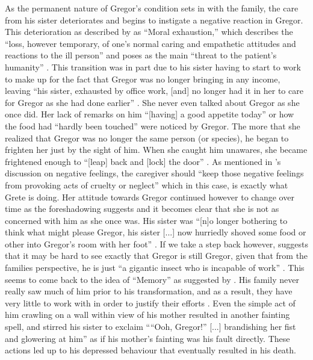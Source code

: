 \documentclass{article}
\begin{document}

As the permanent nature of Gregor's condition sets in with the family, the
care from his sister deteriorates and begins to instigate a negative
reaction in Gregor. This deterioration as described by \citeauthor{rowe2002}
as ``Moral exhaustion,'' which describes the ``loss, however temporary, of
one's normal caring and empathetic attitudes and reactions to the ill
person'' and poses as the main ``threat to the patient's humanity''
\cite[275, 275, 275]{rowe2002}. This transition was in part due to his
sister having to start to work to make up for the fact that Gregor was no
longer bringing in any income, leaving ``his sister, exhausted by office
work, [and] no longer had it in her to care for Gregor as she had done
earlier'' \cite[131]{kafka2007meta}. She never even talked about Gregor as
she once did. Her lack of remarks on him ``[having] a good appetite today''
or how the food had ``hardly been touched'' \cite[111, 111]{kafka2007meta}
were noticed by Gregor. The more that she realized that Gregor was no longer
the same person (or species), he began to frighten her just by the sight of
him. When she caught him unawares, she became frightened enough to ``[leap]
back and [lock] the door'' \cite[116]{kafka2007meta}. As mentioned in
\citeauthor{rowe2002}'s discussion on negative feelings, the caregiver
should ``keep those negative feelings from provoking acts of cruelty or
neglect'' \cite[265]{rowe2002} which in this case, is exactly what Grete is
doing. Her attitude towards Gregor continued however to change over time as
the foreshadowing suggests and it becomes clear that she is not as concerned
with him as she once was. His sister was ``[n]o longer bothering to think
what might please Gregor, his sister [...] now hurriedly shoved some food or
other into Gregor's room with her foot'' \cite[130]{kafka2007meta}. If we
take a step back however, \citeauthor{cantrellFamily} suggests that it may
be hard to see exactly that Gregor is still Gregor, given that from the
families perspective, he is just ``a gigantic insect who is incapable of
work'' \cite[581]{cantrellFamily}. This seems to come back to the idea of
``Memory'' as suggested by \citeauthor{rowe2002}. His family never really
saw much of him prior to his transformation, and as a result, they have very
little to work with in order to justify their efforts \cite[277]{rowe2002}.
Even the simple act of him crawling on a wall within view of his
mother resulted in another fainting spell, and stirred his sister to exclaim
````Ooh, Gregor!'' [...] brandishing her fist and glowering at him''
\cite[122]{kafka2007meta} as if his mother's fainting was his fault
directly. These actions led up to his depressed behaviour that eventually
resulted in his death.
\end{document}
